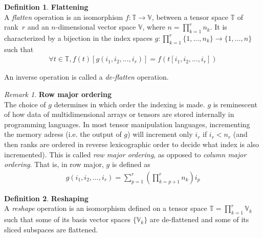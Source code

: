 \documentclass{article}
\theoremstyle{definition}
\newtheorem{definition}{Definition}[section]
\theoremstyle{remark}
\newtheorem{remark}{Remark}
\theoremstyle{plain}
\newcommand{\tspace}{\mathbb{T}}
\newcommand{\vecspace}{\mathbb{V}}
\begin{document}
\begin{definition}\textbf{Flattening}\\
A \emph{flatten} operation is an isomorphism $f: \tspace \rightarrow \vecspace$, between a tensor space $\tspace$ of rank~$r$ and an $n$-dimensional vector space $\vecspace$, where $n =\displaystyle \prod_{k=1}^r n_k$. It is characterized by a bijection in the index spaces $g: \displaystyle \prod_{k=1}^r \{1, \ldots, n_k \} \rightarrow\{1, \ldots, n \}$ such that
\begin{gather*}
  \forall t \in \tspace, f(t)[g(i_1, i_2, \ldots, i_r)] = f(t[i_1, i_2, \ldots, i_r])
\end{gather*}

An inverse operation is called a \emph{de-flatten} operation.
\end{definition}

\begin{remark}\textbf{Row major ordering}\\
The choice of $g$ determines in which order the indexing is made. $g$ is reminescent of how data of multidimensional arrays or tensors are stored internally in programming languages. In most tensor manipulation languages, incrementing the memory adress (i.e. the output of $g$) will increment only $i_r$ if $i_r < n_r$ (and then ranks are ordered in reverse lexicographic order to decide what index is also incremented). This is called \emph{row major ordering}, as opposed to \emph{column major ordering}. That is, in row major, $g$ is defined as
\begin{align}
  g(i_1, i_2, \ldots, i_r) = \displaystyle \sum_{p=1}^r \left( \prod_{k=p+1}^r n_k \right) i_p \label{rowmajor}
\end{align}
\end{remark}

\begin{definition}\textbf{Reshaping}\\
A \emph{reshape} operation is an isomorphism defined on a tensor space $\tspace = \displaystyle \prod_{k=1}^r \vecspace_k$ such that some of its basis vector spaces $\{\vecspace_k\}$ are de-flattened and some of its sliced subspaces are flattened.
\end{definition}
\end{document}

